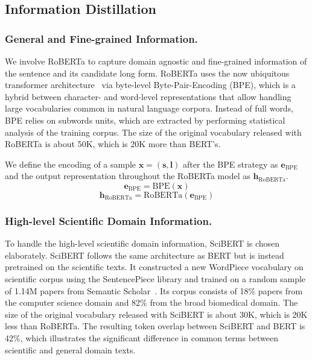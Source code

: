 \subsection{Information Distillation}
\subsubsection{General and Fine-grained Information.}
We involve RoBERTa to capture domain agnostic and fine-grained information of the sentence and its candidate long form.
RoBERTa uses the now ubiquitous transformer architecture~\cite{vaswani2017attention} via byte-level Byte-Pair-Encoding (BPE), which is a hybrid between character- and word-level representations that allow handling large vocabularies common in natural language corpora. Instead of full words, BPE relies on subwords units, which are extracted by performing statistical analysis of the training corpus.
The size of the original vocabulary released with RoBERTa is about 50K, which is 20K more than BERT's.

We define the encoding of a sample $\bm{x}=(\bm{s},\bm{l})$ after the BPE strategy as $\bm{e}_{\mathrm{BPE}}$ and the output representation throughout the RoBERTa model as $\bm{h}_{\mathrm{RoBERTa}}$.
\begin{equation}
    \bm{e}_{\mathrm{BPE}} = \bm{\mathrm{BPE}}(\bm{x})
\end{equation}
\begin{equation}
    \bm{h}_{\mathrm{RoBERTa}} = \bm{\mathrm{RoBERTa}}(\bm{e}_{\mathrm{BPE}})
\end{equation}

\subsubsection{High-level Scientific Domain Information.}
To handle the high-level scientific domain information, SciBERT is chosen elaborately. SciBERT follows the same architecture as BERT but is instead pretrained on the scientific texts.
It constructed a new WordPiece vocabulary on scientific corpus using the SentencePiece
library and trained on a random sample of 1.14M papers from Semantic Scholar~\cite{ammar2018construction}. Its corpus consists of 18\% papers from the computer science domain and 82\% from the broad biomedical domain.
The size of the original vocabulary released with SciBERT is about 30K, which is 20K less than RoBERTa. The resulting token overlap between SciBERT and BERT is 42\%,
which illustrates the significant difference in common terms between scientific and general domain texts.

